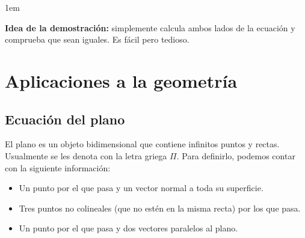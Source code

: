 \documentclass[12pt, fleqn]{report}                             %
\newenvironment{SmallIndentation}[1][0.75em]                    %
        {\begin{adjustwidth}{#1}{}\begin{footnotesize}}             %
        {\end{footnotesize}\end{adjustwidth}}                       %
\theoremstyle{break}                                            %
\begin{document}
            \begin{SmallIndentation}[1em]
                \textbf{Idea de la demostración:} simplemente calcula ambos lados de la ecuación y comprueba que sean iguales. Es fácil pero tedioso.
            \end{SmallIndentation}
        
        
        
      
























    
    
            
            
    \chapter{Aplicaciones a la geometría}
    
        
        \section{Ecuación del plano}
        
        El plano es un objeto bidimensional que contiene infinitos puntos y rectas. Usualmente se les denota con la letra griega $\Pi$. Para definirlo, podemos contar con la siguiente información: \begin{itemize}\setlength\itemsep{0em}
            \item Un punto por el que pasa y un vector normal a toda su superficie.
            \item Tres puntos no colineales (que no estén en la misma recta) por los que pasa.
            \item Un punto por el que pasa y dos vectores paralelos al plano.
        \end{itemize}
    
\end{document}
